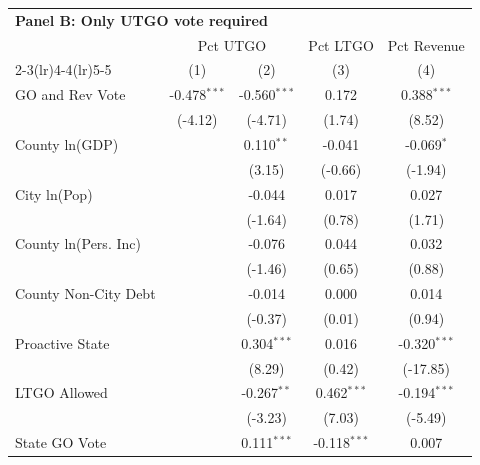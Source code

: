 \begingroup
\centering
\begin{tabular*}{\textwidth}{@{\extracolsep{\fill}}lcccc}
\multicolumn{5}{l}{\textbf{Panel B: Only UTGO vote required}}\\

\addlinespace
   \toprule
    & \multicolumn{2}{c}{Pct UTGO} & Pct LTGO & Pct Revenue\\
   \cmidrule(lr){2-3}\cmidrule(lr){4-4}\cmidrule(lr){5-5}
                               & (1)            & (2)            & (3)            & (4)\\  
   \midrule 
   GO and Rev Vote             & -0.478$^{***}$ & -0.560$^{***}$ & 0.172          & 0.388$^{***}$\\   
                               & (-4.12)       & (-4.71)       & (1.74)        & (8.52)\\   
   County ln(GDP)              &                & 0.110$^{**}$   & -0.041         & -0.069$^{*}$\\   
                               &                & (3.15)        & (-0.66)       & (-1.94)\\   
   City ln(Pop)                &                & -0.044         & 0.017          & 0.027\\   
                               &                & (-1.64)       & (0.78)        & (1.71)\\   
   County ln(Pers. Inc)        &                & -0.076         & 0.044          & 0.032\\   
                               &                & (-1.46)       & (0.65)        & (0.88)\\   
   County Non-City Debt        &                & -0.014         & 0.000          & 0.014\\   
                               &                & (-0.37)       & (0.01)        & (0.94)\\   
   Proactive State             &                & 0.304$^{***}$  & 0.016          & -0.320$^{***}$\\   
                               &                & (8.29)        & (0.42)        & (-17.85)\\   
   LTGO Allowed                &                & -0.267$^{**}$  & 0.462$^{***}$  & -0.194$^{***}$\\   
                               &                & (-3.23)       & (7.03)        & (-5.49)\\   
   State GO Vote               &                & 0.111$^{***}$  & -0.118$^{***}$ & 0.007\\   

\end{tabular*}
